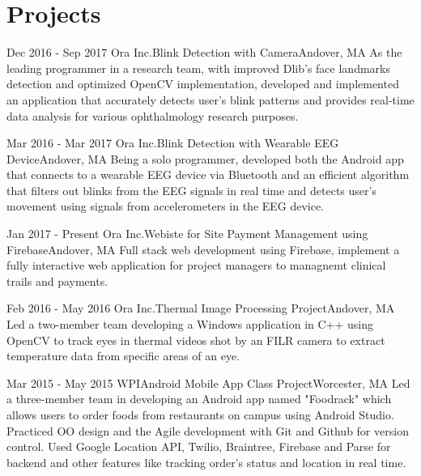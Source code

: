 \documentclass[10pt,a4paper,merriweather]{moderncv}        %
\begin{document}
\section{Projects}

\cventry
{Dec 2016 - Sep 2017}
{Ora Inc.}{Blink Detection with Camera}{Andover, MA}{}
{As the leading programmer in a research team, with improved Dlib's face landmarks detection and optimized OpenCV implementation, developed and implemented an application that accurately detects user's blink patterns and provides real-time data analysis for various ophthalmology research purposes.}
\vspace{.05cm}

\cventry
{Mar 2016 - Mar 2017}
{Ora Inc.}{Blink Detection with Wearable EEG Device}{Andover, MA}{}
{Being a solo programmer, developed both the Android app that connects to a wearable EEG device via Bluetooth and an efficient algorithm that filters out blinks from the EEG signals in real time and detects user's movement using signals from accelerometers in the EEG device.}
\vspace{.05cm}

\cventry
{Jan 2017 - Present}
{Ora Inc.}{Webiste for Site Payment Management using Firebase}{Andover, MA}{}
{Full stack web development using Firebase, implement a fully interactive web application for project managers to managnemt clinical trails and payments.   }
\vspace{.05cm}

\cventry
{Feb 2016 - May 2016}
{Ora Inc.}{Thermal Image Processing Project}{Andover, MA}{}
{Led a two-member team developing a Windows application in C++ using OpenCV to track eyes in thermal videos shot by an FILR camera to extract temperature data from specific areas of an eye. }
\vspace{.05cm}

\cventry
{Mar 2015 - May 2015}
{WPI}{Android Mobile App Class Project}{Worcester, MA}{}
{Led a three-member team in developing an Android app named "Foodrack" which allows users to order foods from restaurants on campus using Android Studio. Practiced OO design and the Agile development with Git and Github for version control. Used Google Location API, Twilio, Braintree, Firebase and Parse for backend and other features like tracking order's status and location in real time. }

\end{document}
